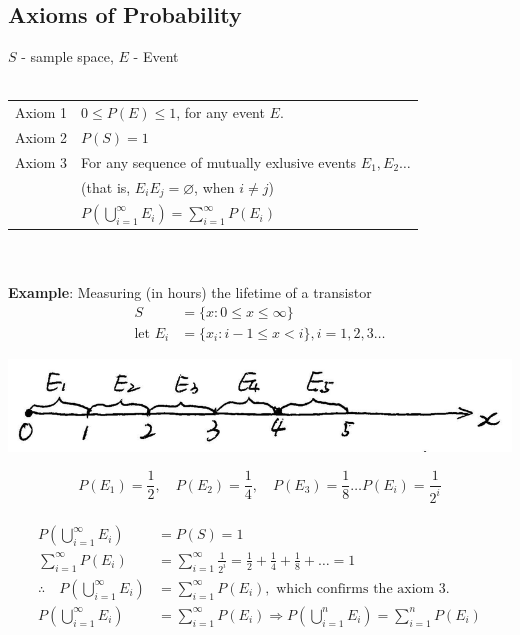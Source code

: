 \documentclass[11pt, letterpaper]{article}
\begin{document}
\subsection{Axioms of Probability}
$S$ - sample space, $E$ - Event \\ \\
\begin{tabular}{l l}
  Axiom 1 & $0 \le P(E) \le 1$, for any event $E$. \\
  Axiom 2 & $P(S) = 1$ \\
  Axiom 3 & For any sequence of mutually exlusive events $E_1,E_2\dots$ \\
          & (that is, $E_iE_j=\varnothing$, when $i \not= j$) \\
          & $P\left(\bigcup_{i=1}^\infty E_i \right) = \sum_{i=1}^\infty P(E_i)$
\end{tabular} \\ \\
\noindent
\textbf{Example}: Measuring (in hours) the lifetime of a transistor
\begin{align*}
  S &= \{ x: 0 \le x \le \infty \} \\
  \text{let } E_i &= \{ x_i: i-1 \le x < i \}, i=1,2,3 \dots
\end{align*}
\begin{center}
\includegraphics[scale=0.5]{2-4}
\end{center}
\begin{equation*}
  P(E_1) = \frac{1}{2}, \quad P(E_2) = \frac{1}{4}, \quad P(E_3) = \frac{1}{8} \dots P(E_i) = \frac{1}{2^i}
\end{equation*} \\
\begin{align*}
  P \left( \bigcup_{i=1}^\infty E_i\right) &= P(S) = 1 \\
  \sum_{i=1}^\infty P(E_i) &= \sum_{i=1}^\infty \frac{1}{2^i} = \frac{1}{2} + \frac{1}{4} + \frac{1}{8} + \dots = 1 \\
  \therefore \quad P \left( \bigcup_{i=1}^\infty E_i \right) &= \sum_{i=1}^\infty P(E_i), \text{ which confirms the axiom 3.} \\
  P \left( \bigcup_{i=1}^\infty E_i\right) &= \sum_{i=1}^\infty P(E_i) \Rightarrow P \left( \bigcup_{i=1}^n E_i\right) = \sum_{i=1}^n P(E_i)
\end{align*} \clearpage
\end{document}
